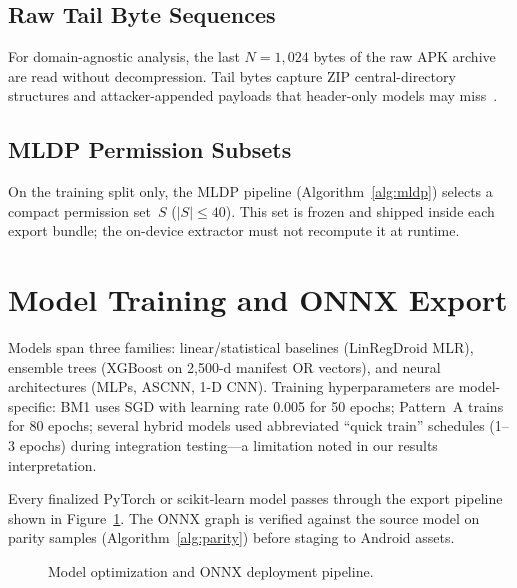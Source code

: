 \subsection{Raw Tail Byte Sequences}
For domain-agnostic analysis, the last $N{=}1{,}024$ bytes of the raw APK archive are read without decompression. Tail bytes capture ZIP central-directory structures and attacker-appended payloads that header-only models may miss~\cite{byteCNN}.

\subsection{MLDP Permission Subsets}
On the training split only, the MLDP pipeline (Algorithm~\ref{alg:mldp}) selects a compact permission set~$S$ ($|S|{\leq}40$). This set is frozen and shipped inside each export bundle; the on-device extractor must not recompute it at runtime.

\section{Model Training and ONNX Export}

Models span three families: linear/statistical baselines (LinRegDroid MLR), ensemble trees (XGBoost on 2,500-d manifest OR vectors), and neural architectures (MLPs, ASCNN, 1-D CNN). Training hyperparameters are model-specific: BM1 uses SGD with learning rate 0.005 for 50 epochs; Pattern~A trains for 80 epochs; several hybrid models used abbreviated ``quick train'' schedules (1--3 epochs) during integration testing---a limitation noted in our results interpretation.

Every finalized PyTorch or scikit-learn model passes through the export pipeline shown in Figure~\ref{fig:onnx-deployment-pipeline}. The ONNX graph is verified against the source model on parity samples (Algorithm~\ref{alg:parity}) before staging to Android assets.

\begin{figure}[h]
\centering
{}
\caption{Model optimization and ONNX deployment pipeline.}
\label{fig:onnx-deployment-pipeline}
\end{figure}

